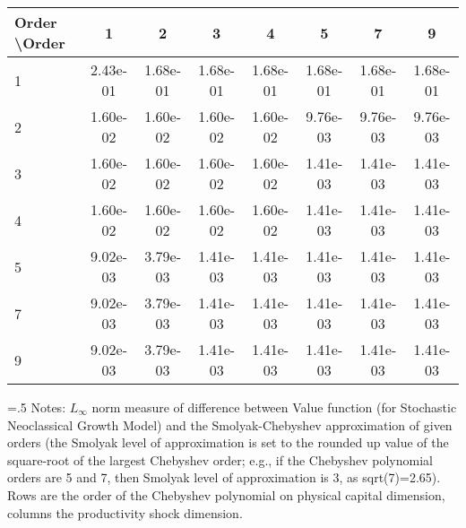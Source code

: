 \begin{tabular*}{1.00\textwidth}{@{\extracolsep{\fill}}l|ccccccc} 
 \hline \hline 
 Order \textbackslash Order & 1 & 2 & 3 & 4 & 5 & 7 & 9 \\ 
 \hline 
1 & 2.43e-01 & 1.68e-01 & 1.68e-01 & 1.68e-01 & 1.68e-01 & 1.68e-01 & 1.68e-01 \\ 
 2 & 1.60e-02 & 1.60e-02 & 1.60e-02 & 1.60e-02 & 9.76e-03 & 9.76e-03 & 9.76e-03 \\ 
 3 & 1.60e-02 & 1.60e-02 & 1.60e-02 & 1.60e-02 & 1.41e-03 & 1.41e-03 & 1.41e-03 \\ 
 4 & 1.60e-02 & 1.60e-02 & 1.60e-02 & 1.60e-02 & 1.41e-03 & 1.41e-03 & 1.41e-03 \\ 
 5 & 9.02e-03 & 3.79e-03 & 1.41e-03 & 1.41e-03 & 1.41e-03 & 1.41e-03 & 1.41e-03 \\ 
 7 & 9.02e-03 & 3.79e-03 & 1.41e-03 & 1.41e-03 & 1.41e-03 & 1.41e-03 & 1.41e-03 \\ 
 9 & 9.02e-03 & 3.79e-03 & 1.41e-03 & 1.41e-03 & 1.41e-03 & 1.41e-03 & 1.41e-03 \\ 
 \hline 
 \end{tabular*} 
\begin{minipage}[t]{1.00\textwidth}{\baselineskip=.5\baselineskip \vspace{.3cm} \footnotesize{ 
Notes: $L_{\infty}$ norm measure of difference between Value function (for Stochastic Neoclassical Growth Model) and the Smolyak-Chebyshev approximation of given orders (the Smolyak level of approximation is set to the rounded up value of the square-root of the largest Chebyshev order; e.g., if the Chebyshev polynomial orders are 5 and 7, then Smolyak level of approximation is 3, as sqrt(7)=2.65). Rows are the order of the Chebyshev polynomial on physical capital dimension, columns the productivity shock dimension. \\ 
}} \end{minipage}
